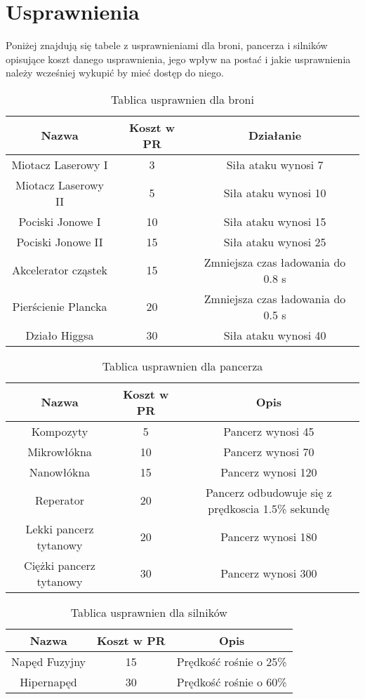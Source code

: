 \section{Usprawnienia}
Poniżej znajdują się tabele z usprawnieniami dla broni, pancerza i silników opisujące koszt danego usprawnienia, jego wpływ na postać i jakie usprawnienia należy wcześniej wykupić by mieć dostęp do niego.

\begin{table}[h]
\centering
\begin{tabular}{ | c | c | c | }
\hline
\textbf{Nazwa} & \textbf{Koszt w PR} & \textbf{Działanie} \\
\hline
Miotacz Laserowy I & 3 & Siła ataku wynosi 7 \\ \hline
Miotacz Laserowy II & 5 & Siła ataku wynosi 10 \\ \hline
Pociski Jonowe I & 10 & Siła ataku wynosi 15 \\ \hline
Pociski Jonowe II & 15 & Siła ataku wynosi 25 \\ \hline
Akcelerator cząstek & 15 & Zmniejsza czas ładowania do 0.8 s \\ \hline
Pierścienie Plancka & 20 & Zmniejsza czas ładowania do 0.5 s \\ \hline
Działo Higgsa & 30 & Siła ataku wynosi 40 \\ \hline
\end{tabular}
\caption{Tablica usprawnien dla broni}
\end{table}

\begin{table}[h]
\centering
\begin{tabular}{ | c | c | c | }
\hline
\textbf{Nazwa} & \textbf{Koszt w PR} & \textbf{Opis} \\
\hline
Kompozyty & 5 & Pancerz wynosi 45 \\ \hline
Mikrowłókna & 10 & Pancerz  wynosi 70 \\ \hline
Nanowłókna & 15 & Pancerz wynosi 120 \\ \hline
Reperator & 20 & Pancerz odbudowuje się z prędkoscia 1.5\% sekundę \\ \hline
Lekki pancerz tytanowy & 20 & Pancerz wynosi 180 \\ \hline
Ciężki pancerz tytanowy & 30 & Pancerz wynosi 300 \\ \hline
\end{tabular}
\caption{Tablica usprawnien dla pancerza}
\end{table}

\begin{table}[h]
\centering
\begin{tabular}{ | c | c | c | }
\hline
\textbf{Nazwa} & \textbf{Koszt w PR} & \textbf{Opis} \\
\hline
Napęd Fuzyjny & 15 & Prędkość rośnie o 25\% \\ \hline
Hipernapęd & 30 & Prędkość rośnie o 60\% \\ \hline
\end{tabular}
\caption{Tablica usprawnien dla silników}
\end{table}
